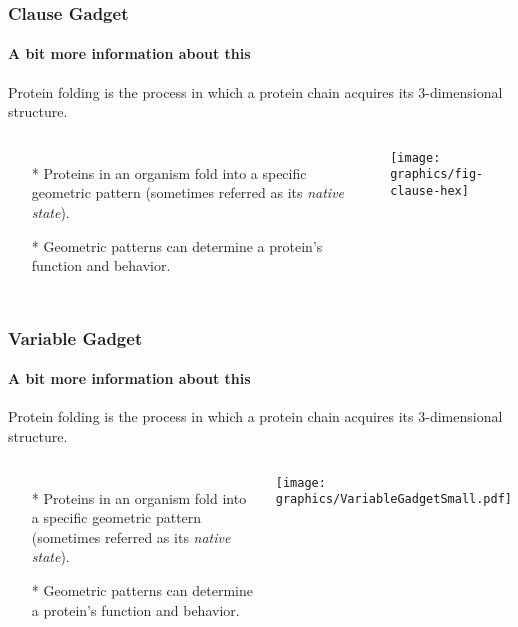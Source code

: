 \documentclass{beamer}
\begin{document}
  \begin{frame}
    \frametitle{Clause Gadget}
    \framesubtitle{A bit more information about this}
      Protein folding is the process in which a protein chain acquires its 3-dimensional structure.
    \begin{columns}[c] %
     \begin{itemize}
     	\item[*] Proteins in an organism fold into a specific geometric pattern (sometimes referred as its \textit{native state}).
     	\item[*]  Geometric patterns can determine a protein's function and behavior. 
     \end{itemize}
	     \begin{minipage}{\linewidth}
			\begin{center}
			\texttt{[image: graphics/fig-clause-hex]}
			\label{fig:clause}
			\end{center}
		\end{minipage}
    \end{columns}
  \end{frame}
  \begin{frame}
    \frametitle{Variable Gadget}
    \framesubtitle{A bit more information about this}
      Protein folding is the process in which a protein chain acquires its 3-dimensional structure.
    \begin{columns}[c] %
     \begin{itemize}
     	\item[*] Proteins in an organism fold into a specific geometric pattern (sometimes referred as its \textit{native state}).
     	\item[*]  Geometric patterns can determine a protein's function and behavior. 
     \end{itemize}
	     \begin{minipage}{\linewidth}
		\begin{center}
		\texttt{[image: graphics/VariableGadgetSmall.pdf]}
		\label{fig:VariableGadgetSmall.pdf}
		\end{center}
		\end{minipage}
    \end{columns}
  \end{frame}
\end{document}
